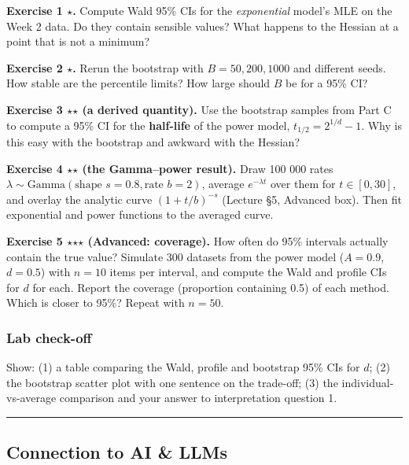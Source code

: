 \textbf{Exercise 1 \ensuremath{\star}.} Compute Wald 95\% CIs for the \emph{exponential}
model's MLE on the Week 2 data. Do they contain sensible values? What
happens to the Hessian at a point that is not a minimum?

\textbf{Exercise 2 \ensuremath{\star}.} Rerun the bootstrap with \(B = 50, 200, 1000\)
and different seeds. How stable are the percentile limits? How large
should \(B\) be for a 95\% CI?

\textbf{Exercise 3 \ensuremath{\star}\ensuremath{\star} (a derived quantity).} Use the bootstrap samples
from Part C to compute a 95\% CI for the \textbf{half-life} of the power
model, \(t_{1/2} = 2^{1/d} - 1\). Why is this easy with the bootstrap
and awkward with the Hessian?

\textbf{Exercise 4 \ensuremath{\star}\ensuremath{\star} (the Gamma--power result).} Draw 100 000 rates
\(\lambda \sim \mathrm{Gamma}(\text{shape } s = 0.8, \text{rate } b = 2)\),
average \(e^{-\lambda t}\) over them for \(t \in [0, 30]\), and overlay
the analytic curve \((1 + t/b)^{-s}\) (Lecture §5, Advanced box). Then
fit exponential and power functions to the averaged curve.

\textbf{Exercise 5 \ensuremath{\star}\ensuremath{\star}\ensuremath{\star} (Advanced: coverage).} How often do 95\%
intervals actually contain the true value? Simulate 300 datasets from
the power model (\(A = 0.9\), \(d = 0.5\)) with \(n = 10\) items per
interval, and compute the Wald and profile CIs for \(d\) for each.
Report the coverage (proportion containing 0.5) of each method. Which is
closer to 95\%? Repeat with \(n = 50\).

\subsubsection{Lab check-off}

Show: (1) a table comparing the Wald, profile and bootstrap 95\% CIs for
\(d\); (2) the bootstrap scatter plot with one sentence on the
trade-off; (3) the individual-vs-average comparison and your answer to
interpretation question 1.

\begin{center}\rule{0.5\linewidth}{0.5pt}\end{center}

\subsection{Connection to AI \& LLMs}

